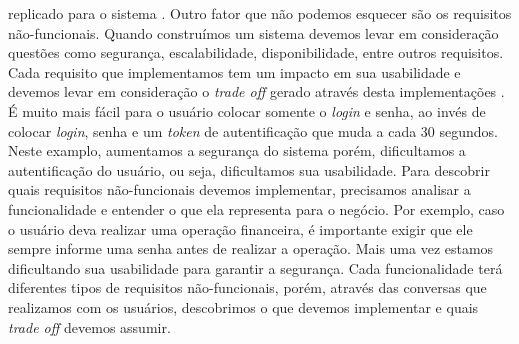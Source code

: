     replicado para o sistema \cite{DomainDrivenDesign}. \newline
    Outro fator que não podemos esquecer são os requisitos não-funcionais. Quando
    construímos um sistema devemos levar em consideração questões como segurança,
    escalabilidade, disponibilidade, entre outros requisitos. Cada requisito que
    implementamos tem um impacto em sua usabilidade e devemos levar em consideração
    o \textit{trade off} gerado através desta implementações \cite{KazmanTheArchitecture1998}.
    É muito mais fácil para o usuário colocar somente o \textit{login} e senha,
    ao invés de colocar \textit{login}, senha e um \textit{token} de autentificação
    que muda a cada 30 segundos. Neste examplo, aumentamos a segurança do sistema
    porém, dificultamos a autentificação do usuário, ou seja, dificultamos sua
    usabilidade. \newline
    Para descobrir quais requisitos não-funcionais devemos implementar, precisamos
    analisar a funcionalidade e entender o que ela representa para o negócio. Por
    exemplo, caso o usuário deva realizar uma operação financeira, é importante
    exigir que ele sempre informe uma senha antes de realizar a operação. Mais uma
    vez estamos dificultando sua usabilidade para garantir a segurança. Cada
    funcionalidade terá diferentes tipos de requisitos não-funcionais, porém,
    através das conversas que realizamos com os usuários, descobrimos o que devemos
    implementar e quais \textit{trade off} devemos assumir.


